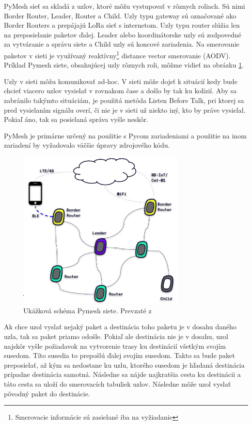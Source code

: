 \documentclass[slovak,master]{diploma}
\begin{document}
PyMesh sieť sa skladá z uzlov, ktoré môžu vystupovať v rôznych roliach. Sú nimi Border Router, Leader, Router a Child. Uzly typu gateway sú označované ako Border Routers a prepájajú LoRa sieť s 
internetom. Uzly typu router slúžia len na preposielanie paketov ďalej. Leader alebo koordinátorske uzly sú zodpovedné za vytváranie a správu siete a Child uzly sú koncové 
zariadenia. Na smerovanie paketov v sieti je využívaný reaktívny\footnote[1]{Smerovacie informácie sú zasielané iba na vyžiadanie} distance vector smerovanie (AODV). 
Príklad Pymesh siete, obsahujúcej uzly rôznych roli, môžme vidieť na obrázku \ref{fig:pymeshTop}.

Uzly v sieti môžu komunikovať ad-hoc. V sieti môže dojsť k situácií kedy bude chcieť viacero uzlov vysielať v rovnakom čase a došlo by tak ku kolízií.
Aby sa zabránilo takýmto situáciám, je použitá metóda Listen Before Talk, pri ktorej sa pred vysielaním signálu overí, či nie je v sieti už niekto iný, kto by práve 
vysielal. Pokiaľ áno, tak sa posielaná správa vyšle neskôr.

PyMesh je primárne určený na použitie s Pycom zariadeniami a použitie na inom zariadení by vyžadovalo väčšie úpravy zdrojového kódu.

\begin{figure}[h!]
	\centering
	\includegraphics[width=0.75\textwidth]{Figures/pymesh_roles.png}
	\caption[Ukážková schéma Pymesh siete]{Ukážková schéma Pymesh siete. Prevzaté z \cite{pycom}}
	\label{fig:pymeshTop}
\end{figure}


Ak chce uzol vyslať nejaký paket a destinácia toho paketu je v dosahu daného uzla, tak sa paket priamo odošle. 
Pokiaľ ale destinácia nie je v dosahu, uzol najskôr vyšle požiadavok na vytvorenie trasy ku destinácií všetkým svojím susedom. Títo susedia to prepošlú ďalej svojím susedom. 
Takto sa bude paket preposielať, až kým sa nedostane ku uzlu, ktorého susedom je hľadaná destinácia prípadne destinácia samotná. Následne sa nájde najkratšia cesta ku destinácii a táto cesta sa uloží do smerovacích 
tabuliek uzlov. Následne môže uzol vyslať pôvodný paket do destinácie.
\end{document}
